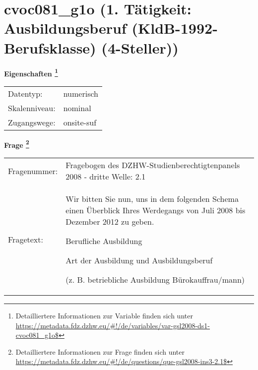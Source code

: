 
    \setcounter{footnote}{0}

    \vspace*{-1.8cm}
	\section{cvoc081\_g1o (1. Tätigkeit: Ausbildungsberuf (KldB-1992-Berufsklasse) (4-Steller))}
	\label{section:cvoc081_g1o}



    \vspace*{0.5cm}
    \noindent\textbf{Eigenschaften
	\footnote{Detailliertere Informationen zur Variable finden sich unter
		\url{https://metadata.fdz.dzhw.eu/\#!/de/variables/var-gsl2008-ds1-cvoc081_g1o$}}}\\
	\begin{tabularx}{\hsize}{@{}lX}
	Datentyp: & numerisch \\
	Skalenniveau: & nominal \\
	Zugangswege: &
	  onsite-suf
 \\
    \end{tabularx}



				\vspace*{0.5cm}
                \noindent\textbf{Frage
	                \footnote{Detailliertere Informationen zur Frage finden sich unter
		              \url{https://metadata.fdz.dzhw.eu/\#!/de/questions/que-gsl2008-ins3-2.1$}}}\\
				\begin{tabularx}{\hsize}{@{}lX}
					Fragenummer: &
					  Fragebogen des DZHW-Studienberechtigtenpanels 2008 - dritte Welle:
					  2.1
 \\
					Fragetext: & Wir bitten Sie nun, uns in dem folgenden Schema einen Überblick Ihres Werdegangs von Juli 2008 bis Dezember 2012 zu geben.\par  Berufliche Ausbildung\par  Art der Ausbildung und Ausbildungsberuf\par  (z. B. betriebliche Ausbildung Bürokauffrau/mann) \\
				\end{tabularx}






